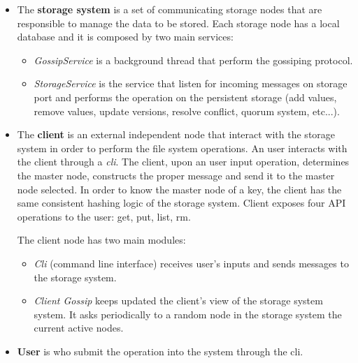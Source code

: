 \begin{itemize}
\item The \textbf{storage system} is a set of communicating storage nodes that are responsible to manage the data to be stored. 
Each storage node has a local database and it is composed by two main services:
\begin{itemize}
\item \textit{GossipService} is a background thread that perform the gossiping protocol.
\item \textit{StorageService} is the service that listen for incoming messages on storage port and performs the operation on the persistent storage (add values, remove values, update versions, resolve conflict, quorum system, etc...).
\end{itemize}

\item The \textbf{client} is an external independent node that interact with the storage system in order to perform the file system operations. An user interacts with  the client through a \textit{cli}. The client, upon an user input operation, determines the master node, constructs the proper message and send it to the master node selected. In order to know the master node of a key, the client has the same consistent hashing logic of the storage system. Client exposes four API operations to the user: get, put, list, rm.

The client node  has two main modules:
\begin{itemize}
\item   \textit{Cli} (command line interface) receives user's inputs and sends messages to the storage system.
\item \textit{Client Gossip}  keeps updated the client's view of the storage system system. It asks periodically to a random node in the storage system the current active nodes.
\end{itemize}

\item \textbf{User} is who submit the operation into the system through the cli.
\end{itemize}

